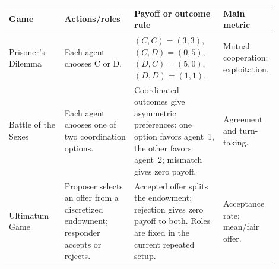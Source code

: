 \begin{tabular}{p{0.20\linewidth}p{0.25\linewidth}p{0.32\linewidth}p{0.13\linewidth}}
\toprule
Game & Actions/roles & Payoff or outcome rule & Main metric \\
\midrule
Prisoner's Dilemma & Each agent chooses C or D. & $(C,C)=(3,3)$, $(C,D)=(0,5)$, $(D,C)=(5,0)$, $(D,D)=(1,1)$. & Mutual cooperation; exploitation. \\
Battle of the Sexes & Each agent chooses one of two coordination options. & Coordinated outcomes give asymmetric preferences: one option favors agent~1, the other favors agent~2; mismatch gives zero payoff. & Agreement and turn-taking. \\
Ultimatum Game & Proposer selects an offer from a discretized endowment; responder accepts or rejects. & Accepted offer splits the endowment; rejection gives zero payoff to both. Roles are fixed in the current repeated setup. & Acceptance rate; mean/fair offer. \\
\bottomrule
\end{tabular}
